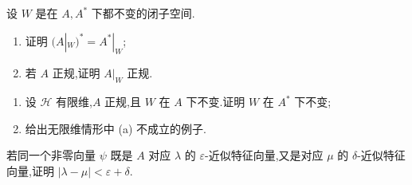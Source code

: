 \begin{exercise}[不变子空间上的正规限制]\label{ex:normal-restriction}
设 \(W\) 是在 \(A,A^{*}\) 下都不变的闭子空间.
\begin{enumerate}[label=(\alph*)]
\item 证明 \((A|_{W})^{*}=A^{*}|_{W}\);
\item 若 \(A\) 正规,证明 \(A|_{W}\) 正规.
\end{enumerate}
\end{exercise}

\begin{exercise}[有限维不变子空间]\label{ex:finite-dimensional-normal-invariant}
\begin{enumerate}[label=(\alph*)]
\item 设 \(\mathcal{H}\) 有限维,\(A\) 正规,且 \(W\) 在 \(A\) 下不变.证明 \(W\) 在 \(A^{*}\) 下不变;
\item 给出无限维情形中 (a) 不成立的例子.
\end{enumerate}
\end{exercise}

\begin{exercise}[两个近似特征值的比较]\label{ex:compare-almost-eigenvalues}
若同一个非零向量 \(\psi\) 既是 \(A\) 对应 \(\lambda\) 的 \(\varepsilon\)-近似特征向量,又是对应 \(\mu\) 的 \(\delta\)-近似特征向量,证明 \(|\lambda-\mu|<\varepsilon+\delta\).
\end{exercise}
